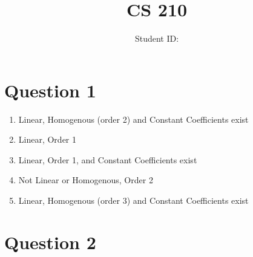 \documentclass[twoside]{article}
\title{CS 210 \hwNo}
\author{\myname \qquad Student ID: \myid}
\date{\currentdate}
\begin{document}
\maketitle

\section*{Question 1}

\begin{enumerate}
    \item[(a)] Linear, Homogenous (order 2) and Constant Coefficients exist
    \item[(b)] Linear, Order 1
    \item[(c)] Linear, Order 1, and Constant Coefficients exist
    \item[(d)] Not Linear or Homogenous, Order 2
    \item[(e)] Linear, Homogenous (order 3) and Constant Coefficients exist  
\end{enumerate}

\section*{Question 2}
\end{document}
